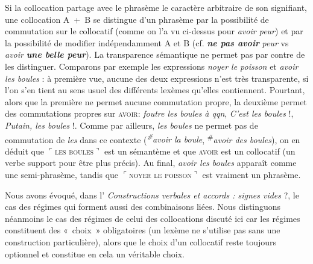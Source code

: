Si la collocation partage avec le phrasème le caractère arbitraire de son signifiant, une collocation A~+~B se distingue d’un phrasème par la possibilité de commutation sur le collocatif (comme on l’a vu ci-dessus pour \textit{avoir peur}) et par la possibilité de modifier indépendamment A et B (cf. \textbf{\textit{ne pas avoir}} \textit{peur} vs \textit{avoir} \textbf{\textit{une belle peur}}). La transparence sémantique ne permet pas par contre de les distinguer. Comparons par exemple les expressions \textit{noyer le poisson} et \textit{avoir les boules} : à première vue, aucune des deux expressions n’est très transparente, si l’on s’en tient au sens usuel des différents lexèmes qu’elles contiennent. Pourtant, alors que la première ne permet aucune commutation propre, la deuxième permet des commutations propres sur \textsc{avoir}: \textit{foutre les boules à qqn}, \textit{C’est les boules} !, \textit{Putain, les boules} !. Comme par ailleurs, \textit{les boules} ne permet pas de commutation de \textit{les} dans ce contexte (\textit{\textsuperscript{\#}}\textit{avoir la boule}, \textsuperscript{\#}\textit{avoir des boules}), on en déduit que $⌜$\textsc{les} \textsc{boules}$⌝$ est un sémantème et que \textsc{avoir} est un collocatif (un verbe support pour être plus précis). Au final, \textit{avoir les boules} apparaît comme une semi-phrasème, tandis que $⌜$\textsc{noyer} \textsc{le} \textsc{poisson}$⌝$ est vraiment un phrasème.

Nous avons évoqué, dans l’ \textit{Constructions verbales et accords : signes vides} ?, le cas des régimes qui forment aussi des combinaisons liées. Nous distinguons néanmoins le cas des régimes de celui des collocations discuté ici car les régimes constituent des «~choix~» obligatoires (un lexème ne s’utilise pas sans une construction particulière), alors que le choix d’un collocatif reste toujours optionnel et constitue en cela un véritable choix.

